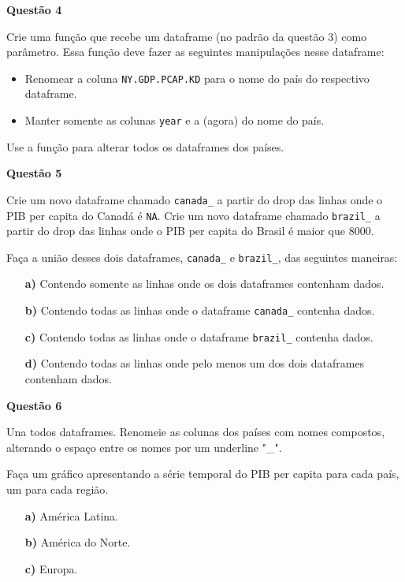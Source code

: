 \documentclass[12pt, a4paper]{article}
\begin{document}
\textbf{Questão 4}

Crie uma função que recebe um dataframe (no padrão da questão 3) como parâmetro. Essa função deve fazer as seguintes manipulações nesse dataframe:

\begin{itemize}
	\item Renomear a coluna \texttt{NY.GDP.PCAP.KD} para o nome do país do respectivo dataframe.
	\item Manter somente as colunas \texttt{year} e a (agora) do nome do país.
\end{itemize}

Use a função para alterar todos os dataframes dos países.



\textbf{Questão 5}

Crie um novo dataframe chamado \texttt{canada\_} a partir do drop das linhas onde o PIB per capita do Canadá é \texttt{NA}. Crie um novo dataframe chamado \texttt{brazil\_} a partir do drop das linhas onde o PIB per capita do Brasil é maior que 8000.

Faça a união desses dois dataframes, \texttt{canada\_} e \texttt{brazil\_}, das seguintes maneiras:

\begin{itemize}
	\item[\textbf{a)}] Contendo somente as linhas onde os dois dataframes contenham dados.
	
	\item[\textbf{b)}] Contendo todas as linhas onde o dataframe \texttt{canada\_} contenha dados.
	
	\item[\textbf{c)}] Contendo todas as linhas onde o dataframe \texttt{brazil\_} contenha dados.
	
	\item[\textbf{d)}] Contendo todas as linhas onde pelo menos um dos dois dataframes contenham dados.
	
\end{itemize}



\textbf{Questão 6}

Una todos dataframes. Renomeie as colunas dos países com nomes compostos, alterando o espaço entre os nomes por um underline "\_". 

Faça um gráfico apresentando a série temporal do PIB per capita para cada país, um para cada região.

\begin{itemize}
	\item[\textbf{a)}] América Latina.
	
	\item[\textbf{b)}] América do Norte.
	
	\item[\textbf{c)}] Europa.
	
\end{itemize}

	
	
\end{document}
